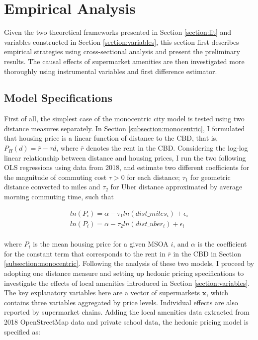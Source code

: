 \documentclass{article}
\begin{document}
\section{Empirical Analysis} \label{section:model}
Given the two theoretical frameworks presented in Section \ref{section:lit} and variables constructed in Section \ref{section:variables}, this section first describes empirical strategies using cross-sectional analysis and present the preliminary results. The causal effects of supermarket amenities are then investigated more thoroughly using instrumental variables and first difference estimator.
\subsection{Model Specifications} \label{subsection:specifications}
First of all, the simplest case of the monocentric city model is tested using two distance measures separately. In Section \ref{subsection:monocentric}, I formulated that housing price is a linear function of distance to the CBD, that is, $P_H(d) = \overline{r} - \tau d$, where $\overline{r}$ denotes the rent in the CBD. Considering the log-log linear relationship between distance and housing prices, I run the two following OLS regressions using data from 2018, and estimate two different coefficients for the magnitude of commuting cost $\tau > 0$ for each distance; $\tau_1$ for geometric distance converted to miles and $\tau_2$ for Uber distance approximated by average morning commuting time, such that

\begin{gather*}
ln(P_i) = \alpha - \tau_1 ln(dist\_miles_i) + \epsilon_i \\
ln(P_i) = \alpha - \tau_2 ln(dist\_uber_i) + \epsilon_i
\end{gather*}
\\
where $P_i$ is the mean housing price for a given MSOA $i$, and $\alpha$ is the coefficient for the constant term that corresponds to the rent in $\overline{r}$ in the CBD in Section \ref{subsection:monocentric}. Following the analysis of these two models, I proceed by adopting one distance measure and setting up hedonic pricing specifications to investigate the effects of local amenities introduced in Section \ref{section:variables}. The key explanatory variables here are a vector of supermarkets $\boldsymbol{x}$, which contains three variables aggregated by price levels. Individual effects are also reported by supermarket chains. Adding the local amenities data extracted from 2018 OpenStreetMap data and private school data, the hedonic pricing model is specified as:
\end{document}
